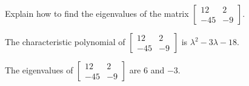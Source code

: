
\begin{exerciseStatement}


Explain how to find the eigenvalues of the matrix \( \left[\begin{array}{cc}
12 & 2 \\
-45 & -9
\end{array}\right] \).


\end{exerciseStatement}
    
\begin{exerciseAnswer} 


The characteristic polynomial of \( \left[\begin{array}{cc}
12 & 2 \\
-45 & -9
\end{array}\right] \) is \( \lambda^{2} - 3 \lambda - 18 \).



The eigenvalues of \( \left[\begin{array}{cc}
12 & 2 \\
-45 & -9
\end{array}\right] \) are \( 6 \) and \( -3 \).


\end{exerciseAnswer}
    
